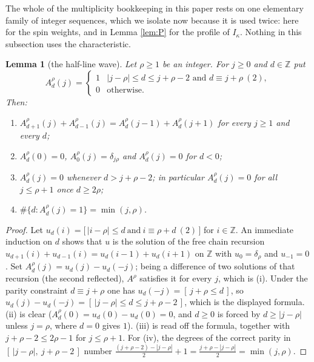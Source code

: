 \documentclass[reqno]{amsart}
\theoremstyle{plain}
\newtheorem{lemma}[theorem]{Lemma}
\theoremstyle{definition}
\newcommand{\ka}{\kappa}
\begin{document}
The whole of the multiplicity bookkeeping in this paper rests on one
elementary family of integer sequences, which we isolate now because it is
used twice: here for the spin weights, and in Lemma \ref{lem:P} for the
profile of $I_\ka$.  Nothing in this subsection uses the characteristic.

\begin{lemma}[the half-line wave]\label{lem:halfline}
Let $\rho\ge1$ be an integer.  For $j\ge0$ and $d\in\mathbb{Z}$ put
\[
   A^{\rho}_d(j)=
   \begin{cases}
     1 & |j-\rho|\le d\le j+\rho-2 \text{ and } d\equiv j+\rho\ (2),\\
     0 & \text{otherwise.}
   \end{cases}
\]
Then:
\begin{enumerate}
\item[\textup{(i)}] $A^{\rho}_{d+1}(j)+A^{\rho}_{d-1}(j)
=A^{\rho}_d(j-1)+A^{\rho}_d(j+1)$ for every $j\ge1$ and every $d$;
\item[\textup{(ii)}] $A^{\rho}_d(0)=0$, $A^{\rho}_0(j)=\delta_{j\rho}$ and
$A^{\rho}_d(j)=0$ for $d<0$;
\item[\textup{(iii)}] $A^{\rho}_d(j)=0$ whenever $d>j+\rho-2$; in particular
$A^{\rho}_d(j)=0$ for all $j\le\rho+1$ once $d\ge 2\rho$;
\item[\textup{(iv)}] $\#\{d:A^{\rho}_d(j)=1\}=\min(j,\rho)$.
\end{enumerate}
\end{lemma}

\begin{proof}
Let $u_d(i)=\bigl[\,|i-\rho|\le d\ \text{and}\ i\equiv\rho+d\ (2)\,\bigr]$ for
$i\in\mathbb{Z}$.  An immediate induction on $d$ shows that $u$ is the
solution of the free chain recursion
$u_{d+1}(i)+u_{d-1}(i)=u_d(i-1)+u_d(i+1)$ on $\mathbb{Z}$ with $u_0=\delta_\rho$
and $u_{-1}=0$.  Set $A^{\rho}_d(j)=u_d(j)-u_d(-j)$; being a difference of two
solutions of that recursion (the second reflected), $A^{\rho}$ satisfies it
for every $j$, which is (i).  Under the parity constraint $d\equiv j+\rho$ one
has $u_d(-j)=[\,j+\rho\le d\,]$, so
$u_d(j)-u_d(-j)=[\,|j-\rho|\le d\le j+\rho-2\,]$, which is the displayed
formula.  (ii) is clear ($A^{\rho}_d(0)=u_d(0)-u_d(0)=0$, and $d\ge0$ is
forced by $d\ge|j-\rho|$ unless $j=\rho$, where $d=0$ gives $1$).  (iii) is
read off the formula, together with $j+\rho-2\le2\rho-1$ for $j\le\rho+1$.
For (iv), the degrees of the correct parity in $[\,|j-\rho|,\ j+\rho-2\,]$
number $\frac{(j+\rho-2)-|j-\rho|}{2}+1=\frac{j+\rho-|j-\rho|}{2}
=\min(j,\rho)$.
\end{proof}
\end{document}
